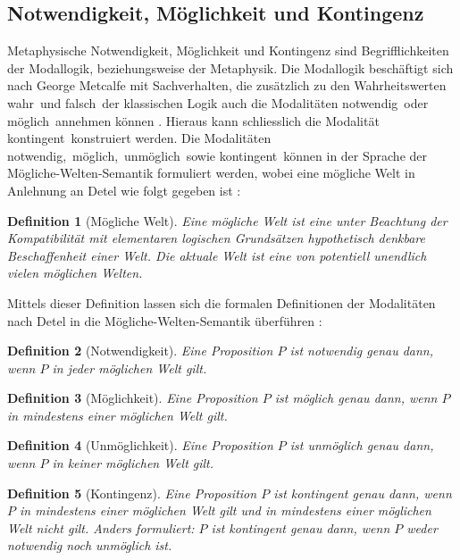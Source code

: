 \documentclass[a4paper,11pt]{article}
\numberwithin{equation}{section}
\newtheorem{dn}{Definition}[subsection]
\begin{document}
\subsection{Notwendigkeit, Möglichkeit und Kontingenz}
Metaphysische Notwendigkeit, Möglichkeit und Kontingenz sind Begrifflichkeiten der Modallogik, beziehungsweise der Metaphysik. Die Modallogik beschäftigt sich nach George Metcalfe mit Sachverhalten, die zusätzlich zu den Wahrheitswerten \flqq wahr\frqq\ und \flqq falsch\frqq\ der klassischen Logik auch die Modalitäten \flqq notwendig\frqq\ oder \flqq möglich\frqq\ annehmen können \cite[S. 27]{GeorgeMetcalfe.2018}. Hieraus kann schliesslich die Modalität \flqq kontingent\frqq\ konstruiert werden. Die Modalitäten \flqq notwendig\frqq,\ \flqq möglich\frqq,\ \flqq unmöglich\frqq\ sowie \flqq kontingent\frqq\ können in der Sprache der Mögliche-Welten-Semantik formuliert werden, wobei eine mögliche Welt in Anlehnung an Detel wie folgt gegeben ist \cite[S. 46]{WolfgangDetel.2014}:
\begin{dn}[Mögliche Welt]
Eine mögliche Welt ist eine unter Beachtung der Kompatibilität mit elementaren logischen Grundsätzen hypothetisch denkbare Beschaffenheit einer Welt. Die aktuale Welt ist eine von potentiell unendlich vielen möglichen Welten.
\end{dn}
Mittels dieser Definition lassen sich die formalen Definitionen der Modalitäten nach Detel in die Mögliche-Welten-Semantik überführen \cite[S. 47]{WolfgangDetel.2014}:
\begin{dn}[Notwendigkeit]
Eine Proposition $P$ ist notwendig genau dann, wenn $P$ in jeder möglichen Welt gilt.
\end{dn}
\begin{dn}[Möglichkeit]
Eine Proposition $P$ ist möglich genau dann, wenn $P$ in mindestens einer möglichen Welt gilt.
\end{dn}
\begin{dn}[Unmöglichkeit]
Eine Proposition $P$ ist unmöglich genau dann, wenn $P$ in keiner möglichen Welt gilt.
\end{dn}
\begin{dn}[Kontingenz]
Eine Proposition $P$ ist kontingent genau dann, wenn $P$ in mindestens einer möglichen Welt gilt und in mindestens einer möglichen Welt nicht gilt. Anders formuliert: $P$ ist kontingent genau dann, wenn $P$ weder notwendig noch unmöglich ist.
\end{dn}






\end{document}
